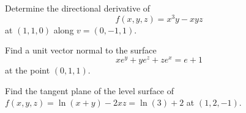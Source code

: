 \documentclass[openany]{book}
\begin{document}
\begin{prob}
    Determine the directional derivative of 
    \begin{equation*}
        f(x,y,z)=x^3y-xyz
    \end{equation*}
    at $(1,1,0)$ along $v=(0,-1,1)$.
\end{prob}





\begin{prob}
    Find a unit vector normal to the surface
    \[xe^y+ye^z+ze^x=e+1\]
    at the point $(0,1,1)$. %
\end{prob}






\begin{prob}
    Find the tangent plane of the level surface of $f(x,y,z)=\ln(x+y)-2xz=\ln(3)+2$ at $(1,2,-1)$.
\end{prob}
\end{document}
